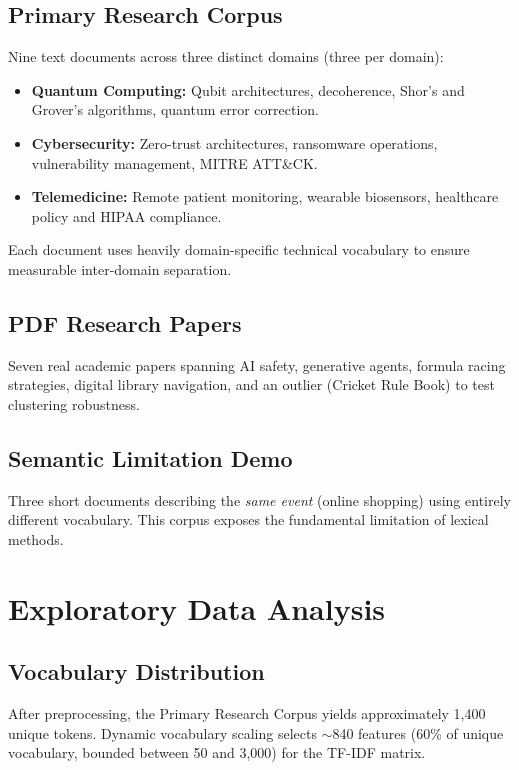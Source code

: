 \documentclass[12pt, a4paper]{article}
\begin{document}
\subsection{Primary Research Corpus}
Nine text documents across three distinct domains (three per domain):
\begin{itemize}[nosep]
    \item \textbf{Quantum Computing:} Qubit architectures, decoherence, Shor's and Grover's algorithms, quantum error correction.
    \item \textbf{Cybersecurity:} Zero-trust architectures, ransomware operations, vulnerability management, MITRE ATT\&CK.
    \item \textbf{Telemedicine:} Remote patient monitoring, wearable biosensors, healthcare policy and HIPAA compliance.
\end{itemize}
Each document uses heavily domain-specific technical vocabulary to ensure measurable inter-domain separation.

\subsection{PDF Research Papers}
Seven real academic papers spanning AI safety, generative agents, formula racing strategies, digital library navigation, and an outlier (Cricket Rule Book) to test clustering robustness.

\subsection{Semantic Limitation Demo}
Three short documents describing the \emph{same event} (online shopping) using entirely different vocabulary. This corpus exposes the fundamental limitation of lexical methods.

\section{Exploratory Data Analysis}

\subsection{Vocabulary Distribution}
After preprocessing, the Primary Research Corpus yields approximately 1,400 unique tokens. Dynamic vocabulary scaling selects $\sim$840 features (60\% of unique vocabulary, bounded between 50 and 3,000) for the TF-IDF matrix.
\end{document}
